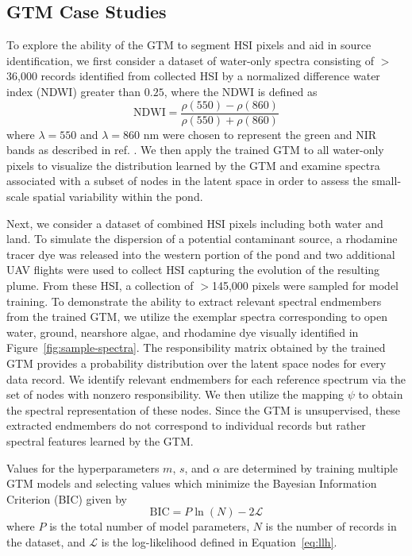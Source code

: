 \subsection{GTM Case Studies}\label{sec:case-studies}

To explore the ability of the GTM to segment HSI pixels and aid in source identification, we first consider a dataset of water-only spectra consisting of $>$36,000 records identified from collected HSI by a normalized difference water index (NDWI) greater than $0.25$, where the NDWI is defined as
\begin{equation}
    \text{NDWI} = \dfrac{\rho(550) - \rho(860)}{\rho(550) + \rho(860)}
\end{equation}
where $\lambda=550$ and $\lambda=860$ nm were chosen to represent the green and NIR bands as described in ref. \cite{ndwi}. We then apply the trained GTM to all water-only pixels to visualize the distribution learned by the GTM and examine spectra associated with a subset of nodes in the latent space in order to assess the small-scale spatial variability within the pond.

Next, we consider a dataset of combined HSI pixels including both water and land. To simulate the dispersion of a potential contaminant source, a rhodamine tracer dye was released into the western portion of the pond and two additional UAV flights were used to collect HSI capturing the evolution of the resulting plume. From these HSI, a collection of $>$145,000 pixels were sampled for model training. To demonstrate the ability to extract relevant spectral endmembers from the trained GTM, we utilize the exemplar spectra corresponding to open water, ground, nearshore algae, and rhodamine dye visually identified in Figure~\ref{fig:sample-spectra}. The responsibility matrix obtained by the trained GTM provides a probability distribution over the latent space nodes for every data record. We identify relevant endmembers for each reference spectrum via the set of nodes with nonzero responsibility. We then utilize the mapping $\psi$ to obtain the spectral representation of these nodes. Since the GTM is unsupervised, these extracted endmembers do not correspond to individual records but rather spectral features learned by the GTM. 

Values for the hyperparameters $m$, $s$, and $\alpha$ are determined by training multiple GTM models and selecting values which minimize the Bayesian Information Criterion (BIC) given by 
\begin{equation}
    \text{BIC} = P\ln(N) - 2\mathcal{L}
\end{equation}
where $P$ is the total number of model parameters, $N$ is the number of records in the dataset, and $\mathcal{L}$ is the log-likelihood defined in Equation~\eqref{eq:llh}.

